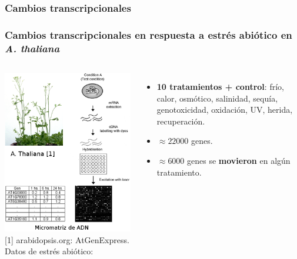 \documentclass[serif,9pt, t]{beamer}
\newcommand\Fontvi{\fontsize{7}{7.2}\selectfont}
\begin{document}
\subsubsection*{Cambios transcripcionales}
\begin{frame}\frametitle{Cambios transcripcionales en respuesta a estrés abiótico en \textit{A. thaliana}} 
	\begin{columns}[T]
			\includegraphics[width=1\textwidth]{micromatriz_y_arabidopsis}\\
			\tiny
			[1] arabidopsis.org: AtGenExpress.
			\Large 
			Datos de estrés abiótico:
			\medskip
			\Fontvi
			\begin{itemize}
				\item \textbf{10 tratamientos + control}: frío, calor, osmótico, salinidad, sequía, genotoxicidad, oxidación, UV, herida, recuperación.
				\item $\approx 22000$ genes.
				\item $\approx 6000$ genes se \textbf{movieron} en algún tratamiento.

\end{itemize}
\end{columns}
\end{frame}
\end{document}
